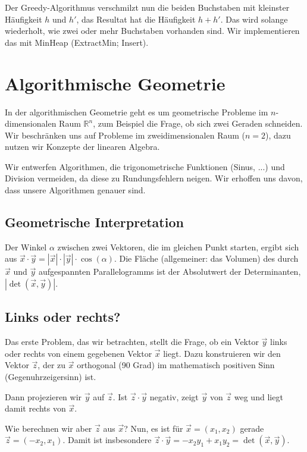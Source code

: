 \documentclass[12pt]{article}
\begin{document}
Der Greedy-Algorithmus verschmilzt nun die beiden Buchstaben mit kleinster Häufigkeit $h$ und $h'$, das Resultat hat die Häufigkeit $h + h'$. Das wird solange wiederholt, wie zwei oder mehr Buchstaben vorhanden sind. Wir implementieren das mit MinHeap (ExtractMin; Insert).

\section{Algorithmische Geometrie}

In der algorithmischen Geometrie geht es um geometrische Probleme im $n$-dimensionalen Raum $\mathbb{R}^n$, zum Beispiel die Frage, ob sich zwei Geraden schneiden. Wir beschränken uns auf Probleme im zweidimensionalen Raum ($n = 2$), dazu nutzen wir Konzepte der linearen Algebra.

Wir entwerfen Algorithmen, die trigonometrische Funktionen (Sinus, ...) und Division vermeiden, da diese zu Rundungsfehlern neigen. Wir erhoffen uns davon, dass unsere Algorithmen genauer sind.

\subsection{Geometrische Interpretation}

Der Winkel $\alpha$ zwischen zwei Vektoren, die im gleichen Punkt starten, ergibt sich aus $\vec{x} \cdot \vec{y} = |\vec{x}| \cdot |\vec{y}| \cdot \cos(\alpha)$. Die Fläche (allgemeiner: das Volumen) des durch $\vec{x}$ und $\vec{y}$ aufgespannten Parallelogramms ist der Absolutwert der Determinanten, $|\det(\vec{x}, \vec{y})|$.

\subsection{Links oder rechts?}

Das erste Problem, das wir betrachten, stellt die Frage, ob ein Vektor $\vec{y}$ links oder rechts von einem gegebenen Vektor $\vec{x}$ liegt. Dazu konstruieren wir den Vektor $\vec{z}$, der zu $\vec{x}$ orthogonal (90 Grad) im mathematisch positiven Sinn (Gegenuhrzeigersinn) ist.

Dann projezieren wir $\vec{y}$ auf $\vec{z}$. Ist $\vec{z} \cdot \vec{y}$ negativ, zeigt $\vec{y}$ von $\vec{z}$ weg und liegt damit rechts von $\vec{x}$.

Wie berechnen wir aber $\vec{z}$ aus $\vec{x}$? Nun, es ist für $\vec{x} = (x_1, x_2)$ gerade $\vec{z} = (-x_2, x_1)$. Damit ist insbesondere $\vec{z} \cdot \vec{y} = -x_2y_1 + x_1y_2 = \det(\vec{x}, \vec{y})$.
\end{document}
